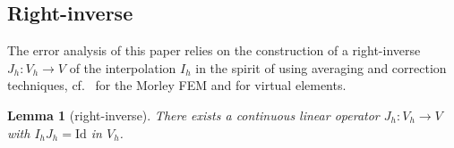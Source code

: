 \documentclass[a4paper]{amsart}
\numberwithin{equation}{section}
\newtheorem{lemma}[theorem]{Lemma}
\theoremstyle{definition}
\theoremstyle{remark}
\numberwithin{theorem}{section}
\numberwithin{equation}{section}
\numberwithin{table}{section}
\numberwithin{figure}{section}
\begin{document}
\subsection{Right-inverse}\label{sec:right-inverse}
The error analysis of this paper relies on the construction of a right-inverse $J_h : V_h \to V$ of the interpolation $I_h$ in the spirit of \cite{VeeserZanotti2019,ErnZanotti2020} using averaging and correction techniques, cf.~\cite{Gallistl2015} for the Morley FEM and \cite{CarstensenKhotPani2023,KhotMoraRuizBaier2025} for virtual elements.

\begin{lemma}[right-inverse]\label{lem:right-inverse}
    There exists a continuous linear operator $J_h : V_h \to V$ with $I_h J_h = \mathrm{Id}$ in $V_h$.
\end{lemma}
\end{document}
